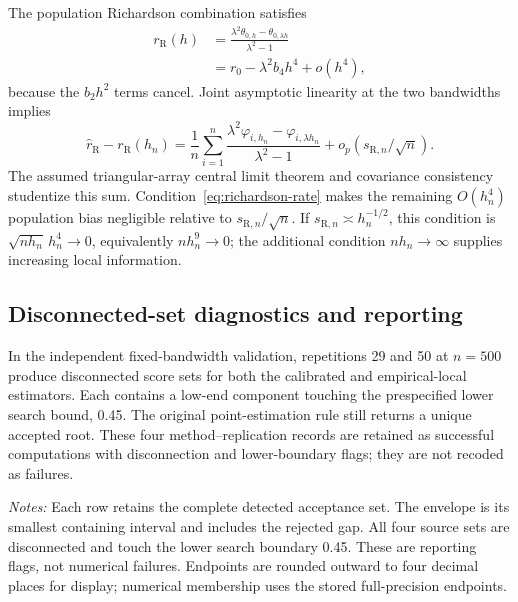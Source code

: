 The population Richardson combination satisfies
\begin{align}
r_{\mathrm R}(h)
&=\frac{\lambda^2\theta_{0,h}-\theta_{0,\lambda h}}
{\lambda^2-1}\\
&=r_0-\lambda^2b_4h^4+o(h^4),
\end{align}
because the $b_2h^2$ terms cancel. Joint asymptotic linearity at the two
bandwidths implies
\begin{equation}
\widehat r_{\mathrm R}-r_{\mathrm R}(h_n)
=\frac{1}{n}\sum_{i=1}^n
\frac{\lambda^2\varphi_{i,h_n}-\varphi_{i,\lambda h_n}}
{\lambda^2-1}
+o_p(s_{\mathrm R,n}/\sqrt n).
\end{equation}
The assumed triangular-array central limit theorem and covariance consistency
studentize this sum. Condition~\eqref{eq:richardson-rate} makes the remaining
$O(h_n^4)$ population bias negligible relative to
$s_{\mathrm R,n}/\sqrt n$. If $s_{\mathrm R,n}\asymp h_n^{-1/2}$, this
condition is $\sqrt{nh_n}\,h_n^4\to0$, equivalently $nh_n^9\to0$; the
additional condition $nh_n\to\infty$ supplies increasing local information.

\subsection{Disconnected-set diagnostics and reporting}
\label{app:disconnected-set-diagnostic}

In the independent fixed-bandwidth validation, repetitions 29 and 50 at
$n=500$ produce disconnected score sets for both the calibrated and
empirical-local estimators. Each contains a low-end component touching the
prespecified lower search bound, 0.45. The original point-estimation rule
still returns a unique accepted root. These four method--replication records
are retained as successful computations with disconnection and lower-boundary
flags; they are not recoded as failures.

\begin{table}[htbp]
\centering
\small
\caption{Flagged score sets in the independent validation}
\label{tab:confidence-set-flagged}
\resizebox{\textwidth}{!}{}
\begin{minipage}{0.96\textwidth}
\footnotesize
\emph{Notes:} Each row retains the complete detected acceptance set. The
envelope is its smallest containing interval and includes the rejected gap.
All four source sets are disconnected and touch the lower search boundary
0.45. These are reporting flags, not numerical failures. Endpoints are rounded
outward to four decimal places for display; numerical membership uses the
stored full-precision endpoints.
\end{minipage}
\end{table}

